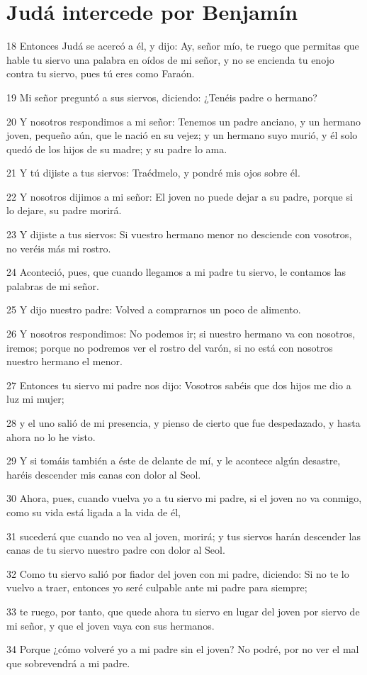 \section*{Judá intercede por Benjamín}

\par 18 Entonces Judá se acercó a él, y dijo: Ay, señor mío, te ruego que permitas que hable tu siervo una palabra en oídos de mi señor, y no se encienda tu enojo contra tu siervo, pues tú eres como Faraón.
\par 19 Mi señor preguntó a sus siervos, diciendo: ¿Tenéis padre o hermano?
\par 20 Y nosotros respondimos a mi señor: Tenemos un padre anciano, y un hermano joven, pequeño aún, que le nació en su vejez; y un hermano suyo murió, y él solo quedó de los hijos de su madre; y su padre lo ama.
\par 21 Y tú dijiste a tus siervos: Traédmelo, y pondré mis ojos sobre él.
\par 22 Y nosotros dijimos a mi señor: El joven no puede dejar a su padre, porque si lo dejare, su padre morirá.
\par 23 Y dijiste a tus siervos: Si vuestro hermano menor no desciende con vosotros, no veréis más mi rostro.
\par 24 Aconteció, pues, que cuando llegamos a mi padre tu siervo, le contamos las palabras de mi señor.
\par 25 Y dijo nuestro padre: Volved a comprarnos un poco de alimento.
\par 26 Y nosotros respondimos: No podemos ir; si nuestro hermano va con nosotros, iremos; porque no podremos ver el rostro del varón, si no está con nosotros nuestro hermano el menor.
\par 27 Entonces tu siervo mi padre nos dijo: Vosotros sabéis que dos hijos me dio a luz mi mujer;
\par 28 y el uno salió de mi presencia, y pienso de cierto que fue despedazado, y hasta ahora no lo he visto.
\par 29 Y si tomáis también a éste de delante de mí, y le acontece algún desastre, haréis descender mis canas con dolor al Seol.
\par 30 Ahora, pues, cuando vuelva yo a tu siervo mi padre, si el joven no va conmigo, como su vida está ligada a la vida de él,
\par 31 sucederá que cuando no vea al joven, morirá; y tus siervos harán descender las canas de tu siervo nuestro padre con dolor al Seol.
\par 32 Como tu siervo salió por fiador del joven con mi padre, diciendo: Si no te lo vuelvo a traer, entonces yo seré culpable ante mi padre para siempre;
\par 33 te ruego, por tanto, que quede ahora tu siervo en lugar del joven por siervo de mi señor, y que el joven vaya con sus hermanos.
\par 34 Porque ¿cómo volveré yo a mi padre sin el joven? No podré, por no ver el mal que sobrevendrá a mi padre.

